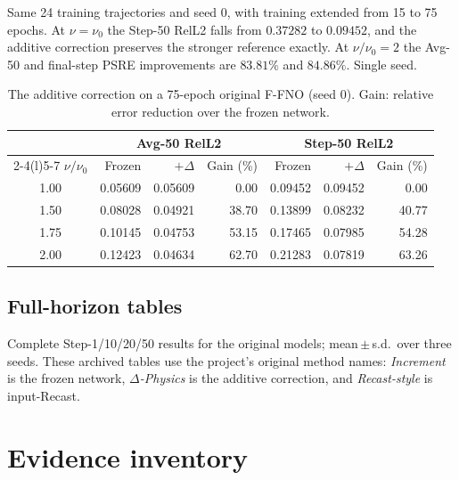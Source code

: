 \documentclass{article}
\theoremstyle{plain}
\newcommand{\add}{additive correction\xspace}
\begin{document}
Same 24 training trajectories and seed 0, with training extended from 15 to 75 epochs. At $\nu=\nu_0$ the Step-50 RelL2 falls from $0.37282$ to $0.09452$, and the \add preserves the stronger reference exactly. At $\nu/\nu_0=2$ the Avg-50 and final-step PSRE improvements are $83.81\%$ and $84.86\%$. Single seed.

\begin{table}[H]
\caption{The \add on a 75-epoch original F-FNO (seed 0). Gain: relative error reduction over the frozen network.}
\label{tab:training_budget}
\centering
\small
\begin{tabular}{c rrr rrr}
\toprule
& \multicolumn{3}{c}{Avg-50 RelL2} & \multicolumn{3}{c}{Step-50 RelL2} \\
\cmidrule(lr){2-4}\cmidrule(l){5-7}
$\nu/\nu_0$ & Frozen & $+\Delta$ & Gain (\%) & Frozen & $+\Delta$ & Gain (\%) \\
\midrule
1.00 & 0.05609 & 0.05609 & 0.00 & 0.09452 & 0.09452 & 0.00 \\
1.50 & 0.08028 & 0.04921 & 38.70 & 0.13899 & 0.08232 & 40.77 \\
1.75 & 0.10145 & 0.04753 & 53.15 & 0.17465 & 0.07985 & 54.28 \\
2.00 & 0.12423 & 0.04634 & 62.70 & 0.21283 & 0.07819 & 63.26 \\
\bottomrule
\end{tabular}
\end{table}

\subsection{Full-horizon tables}
\label{app:full_tables}

Complete Step-1/10/20/50 results for the original models; mean\,$\pm$\,s.d.\ over three seeds. These archived tables use the project's original method names: \emph{Increment} is the frozen network, \emph{$\Delta$-Physics} is the \add, and \emph{Recast-style} is input-Recast.




\FloatBarrier
\section{Evidence inventory}
\label{app:inventory}
\end{document}
